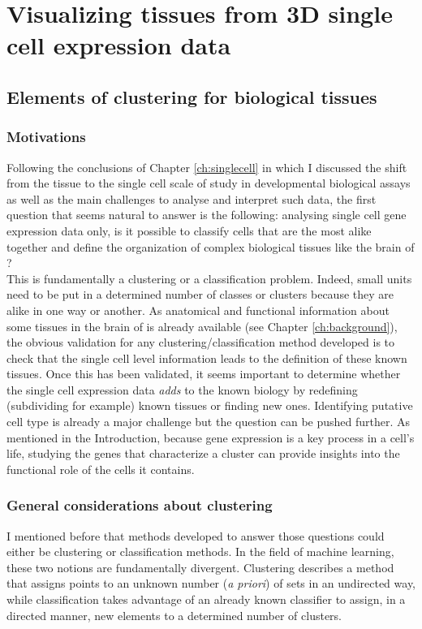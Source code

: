 \chapter{Visualizing tissues from 3D single cell expression data}\label{ch:non_spatial_clustering_visualization} 
\section{Elements of clustering for biological tissues}
	\subsection{Motivations}
	Following the conclusions of Chapter \ref{ch:singlecell} in which I discussed the shift from the tissue to the single cell scale of study in developmental biological assays as well as the main challenges to analyse and interpret such data, the first question that seems natural to answer is the following: analysing single cell gene expression data only, is it possible to classify cells that are the most alike together and define the organization of complex biological tissues like the brain of \platyfull{}?\\
	
	This is fundamentally a clustering or a classification problem. Indeed, small units need to be put in a determined number of classes or clusters because they are alike in one way or another. As anatomical and functional information about some tissues in the brain of \platy{} is already available (see Chapter \ref{ch:background}), the obvious validation for any clustering/classification method developed is to check that the single cell level information leads to the definition of these known tissues. Once this has been validated, it seems important to determine whether the single cell expression data \emph{adds} to the known biology by redefining (subdividing for example) known tissues or finding new ones. Identifying putative cell type is already a major challenge but the question can be pushed further. As mentioned in the Introduction, because gene expression is a key process in a cell's life, studying the genes that characterize a cluster can provide insights into the functional role of the cells it contains.

	\subsection{General considerations about clustering}
	I mentioned before that methods developed to answer those questions could either be clustering or classification methods. In the field of machine learning, these two notions are fundamentally divergent. Clustering describes a method that assigns points to an unknown number (\emph{a priori}) of sets in an undirected way, while classification takes advantage of an already known classifier to assign, in a directed manner, new elements to a determined number of clusters.\\
	
